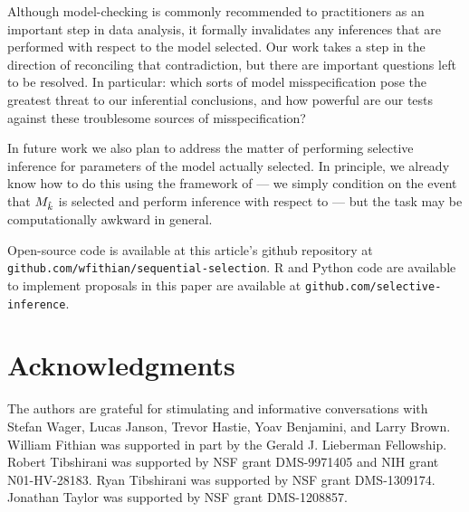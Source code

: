 \documentclass{article}
\begin{document}
Although model-checking is commonly recommended to practitioners as an important step in data analysis, it formally invalidates any inferences that are performed with respect to the model selected. Our work takes a step in the direction of reconciling that contradiction, but there are important questions left to be resolved. In particular: which sorts of model misspecification pose the greatest threat to our inferential conclusions, and how powerful are our tests against these troublesome sources of misspecification? 

In future work we also plan to address the matter of performing selective inference for parameters of the model actually selected. In principle, we already know how to do this using the framework of \citet{fithian2014optimal} --- we simply condition on the event that $M_{\hat{k}}$ is selected and perform inference with respect to  --- but the task may be computationally awkward in general.

Open-source code is available at this article's github repository at \texttt{github.com/wfithian/sequential-selection}. R and Python code are available to implement proposals in this paper are available at \texttt{github.com/selective-inference}.

\section*{Acknowledgments}

The authors are grateful for stimulating and informative conversations with Stefan Wager, Lucas Janson, Trevor Hastie, Yoav Benjamini, and Larry Brown. William Fithian was supported in part by the Gerald J. Lieberman Fellowship. Robert Tibshirani was supported by NSF grant DMS-9971405 and NIH grant N01-HV-28183. Ryan Tibshirani was supported by NSF grant DMS-1309174. Jonathan Taylor was supported by NSF grant DMS-1208857.




\newpage
\end{document}

